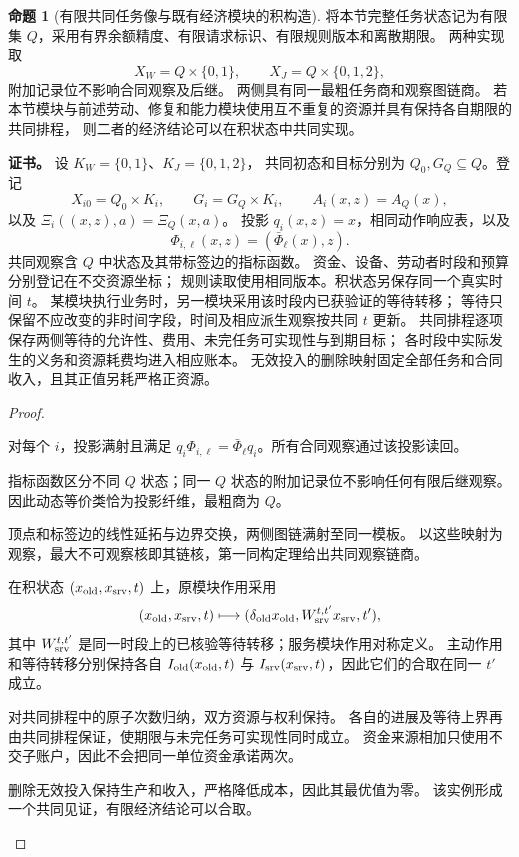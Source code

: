 \documentclass[UTF8,12pt,a4paper,openany,fontset=none,zihao=false]{ctexrep}
\theoremstyle{definition}
\newtheorem{proposition}{命题}[chapter]
\newenvironment{certificate}{\par\noindent\textbf{证书。}\ignorespaces}{\par}
\newcommand{\1}{\mathbf 1}
\begin{document}
\begin{proposition}[有限共同任务像与既有经济模块的积构造]
\label{joint:service-product}
将本节完整任务状态记为有限集 \(Q\)，采用有界余额精度、有限请求标识、有限规则版本和离散期限。
两种实现取
\[
X_W=Q\times\{0,1\},\qquad
X_J=Q\times\{0,1,2\},
\]
附加记录位不影响合同观察及后继。
两侧具有同一最粗任务商和观察图链商。
若本节模块与前述劳动、修复和能力模块使用互不重复的资源并具有保持各自期限的共同排程，
则二者的经济结论可以在积状态中共同实现。
\end{proposition}
\begin{certificate}
设 \(K_W=\{0,1\}\)、\(K_J=\{0,1,2\}\)，
共同初态和目标分别为 \(Q_0,G_Q\subseteq Q\)。登记
\[
X_{i0}=Q_0\times K_i,\qquad G_i=G_Q\times K_i,
\qquad A_i(x,z)=A_Q(x),
\]
以及 \(\Xi_i((x,z),a)=\Xi_Q(x,a)\)。
投影 \(q_i(x,z)=x\)，相同动作响应表，以及
\[
\Phi_{i,\ell}(x,z)=(\bar\Phi_\ell(x),z).
\]
共同观察含 \(Q\) 中状态及其带标签边的指标函数。
资金、设备、劳动者时段和预算分别登记在不交资源坐标；
规则读取使用相同版本。积状态另保存同一个真实时间 \(t\)。
某模块执行业务时，另一模块采用该时段内已获验证的等待转移；
等待只保留不应改变的非时间字段，时间及相应派生观察按共同 \(t\) 更新。
共同排程逐项保存两侧等待的允许性、费用、未完任务可实现性与到期目标；
各时段中实际发生的义务和资源耗费均进入相应账本。
无效投入的删除映射固定全部任务和合同收入，且其正值另耗严格正资源。
\end{certificate}
\begin{proof}
\begin{semanticsteps}
\item 对每个 \(i\)，投影满射且满足
\(q_i\Phi_{i,\ell}=\bar\Phi_\ell q_i\)。所有合同观察通过该投影读回。
\item 指标函数区分不同 \(Q\) 状态；同一 \(Q\) 状态的附加记录位不影响任何有限后继观察。
因此动态等价类恰为投影纤维，最粗商为 \(Q\)。
\item 顶点和标签边的线性延拓与边界交换，两侧图链满射至同一模板。
以这些映射为观察，最大不可观察核即其链核，第一同构定理给出共同观察链商。
\item 在积状态 \((x_{\rm old},x_{\rm srv},t)\) 上，原模块作用采用
\[
(x_{\rm old},x_{\rm srv},t)
\longmapsto
(\delta_{\rm old}x_{\rm old},W_{\rm srv}^{t,t'}x_{\rm srv},t'),
\]
其中 \(W_{\rm srv}^{t,t'}\) 是同一时段上的已核验等待转移；服务模块作用对称定义。
主动作用和等待转移分别保持各自 \(I_{\rm old}(x_{\rm old},t)\) 与
\(I_{\rm srv}(x_{\rm srv},t)\)，因此它们的合取在同一 \(t'\) 成立。
\item 对共同排程中的原子次数归纳，双方资源与权利保持。
各自的进展及等待上界再由共同排程保证，使期限与未完任务可实现性同时成立。
资金来源相加只使用不交子账户，因此不会把同一单位资金承诺两次。
\item 删除无效投入保持生产和收入，严格降低成本，因此其最优值为零。
该实例形成一个共同见证，有限经济结论可以合取。
\end{semanticsteps}
\end{proof}
\end{document}
